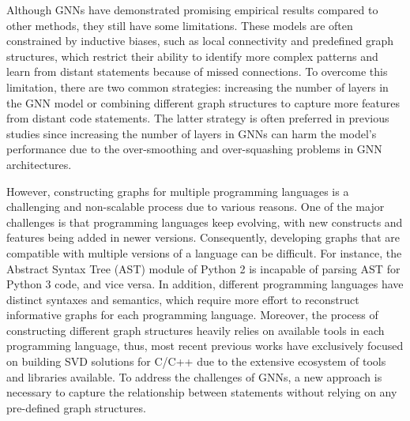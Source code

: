\documentclass{ieeeaccess}
\begin{document}
\par Although GNNs have demonstrated promising empirical results compared to other methods, they still have some limitations. These models are often constrained by inductive biases, such as local connectivity and predefined graph structures, which restrict their ability to identify more complex patterns and learn from distant statements because of missed connections. To overcome this limitation, there are two common strategies: increasing the number of layers in the GNN model or combining different graph structures to capture more features from distant code statements. The latter strategy is often preferred in previous studies \cite{Linevd, DeepWukong, MVD, IVDetect, Are} since increasing the number of layers in GNNs can harm the model's performance due to the over-smoothing \cite{over_smooth} and over-squashing\cite{over_squash} problems in GNN  architectures. 

However, constructing graphs for multiple programming languages is a challenging and non-scalable process due to various reasons. One of the major challenges is that programming languages keep evolving, with new constructs and features being added in newer versions. Consequently, developing graphs that are compatible with multiple versions of a language can be difficult. For instance, the Abstract Syntax Tree (AST) module of Python 2 is incapable of parsing AST for Python 3 code, and vice versa. In addition, different programming languages have distinct syntaxes and semantics, which require more effort to reconstruct informative graphs for each programming language. Moreover, the process of constructing different graph structures heavily relies on available tools in each programming language, thus, most recent previous works \cite{Are,devign,DeepWukong,Linevd,MVD,IVDetect} have exclusively focused on building SVD solutions for C/C++  due to  the extensive ecosystem of tools and libraries available\cite{c_tool1,c_tool2,ctool3,ctool4}. To address the challenges of GNNs, a new approach is necessary to capture the relationship between statements without relying on any pre-defined graph structures.
\end{document}
